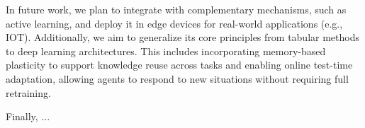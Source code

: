 In future work, we plan to integrate \adaptiverl with complementary mechanisms, such as active learning, and deploy it in edge devices for real-world applications (e.g., \ac{IOT}). Additionally, we aim to generalize its core principles from tabular methods to deep learning architectures. This includes incorporating memory-based plasticity to support knowledge reuse across tasks and enabling online test-time adaptation, allowing agents to respond to new situations without requiring full retraining.

Finally, ...

\endinput

